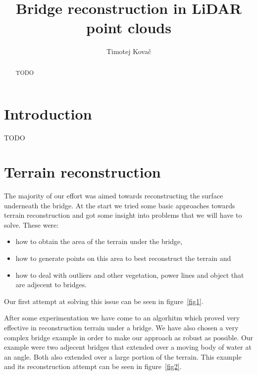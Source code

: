 \documentclass{egpubl-eurovis-star}
\title[EG \LaTeX\ Author Guidelines]%
      {Bridge reconstruction in LiDAR point clouds}
\author[submission ID]{Timotej Kovač}
\begin{document}

\maketitle

\begin{abstract}
TODO
\end{abstract}



\section{Introduction}

TODO




\section{Terrain reconstruction}

The majority of our effort was aimed towards reconstructing the surface underneath the bridge.
At the start we tried some basic approaches towards terrain reconstruction and got some insight into problems that we will have to solve.
These were:
\begin{itemize}
\item{how to obtain the area of the terrain under the bridge,}
\item{how to generate points on this area to best reconstruct the terrain and}
\item{how to deal with outliers and other vegetation, power lines and object that are adjecent to bridges.}
\end{itemize}

Our first attempt at solving this issue can be seen in figure~\ref{fig1}.


After some experimentation we have come to an algorhitm which proved very effective in reconstruction terrain under a bridge.
We have also chosen a very complex bridge example in order to make our approach as robust as possible.
Our example were two adjecent bridges that extended over a moving body of water at an angle.
Both also extended over a large portion of the terrain.
This example and its reconstruction attempt can be seen in figure~\ref{fig2}.

\end{document}

